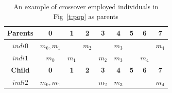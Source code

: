\documentclass[journal]{IEEEtran}
\begin{document}
\begin{table}[!t]
	\renewcommand{\arraystretch}{1.3}
	\newcommand{\tabincell}[2]{\begin{tabular}{@{}#1@{}}#2\end{tabular}}
	\caption{An example of crossover employed individuals in Fig~\ref{t:pop} as parents}
	\label{t:crossover}
	\centering
	\begin{tabular}{|c||c||c||c||c||c||c||c||c|}
		\hline
		\textbf{Parents}& 
		\textbf{0} & 
		\textbf{1} & 
		\textbf{2} & 
		\textbf{3} &
		\textbf{4} & 
		\textbf{5} & 
		\textbf{6} & 
		\textbf{7} \\		
		\hline
		$indi0$	&$m_0,m_1$&	&$m_2$&	&$m_3$& & &$m_4$\\		
		\hline		
		$indi1$	&$m_0$&$m_1$&	&$m_2$&$m_3$& &$m_4$&	\\		
		\hline
		\hline
			\textbf{Child}& 
			\textbf{0} & 
			\textbf{1} & 
			\textbf{2} & 
			\textbf{3} &
			\textbf{4} & 
			\textbf{5} & 
			\textbf{6} & 
			\textbf{7} \\		
			\hline
			$indi2$	&$m_0,m_1$&	& &$m_2$&$m_3$& & &$m_4$\\			
		\hline
	\end{tabular}
\end{table}
\end{document}
